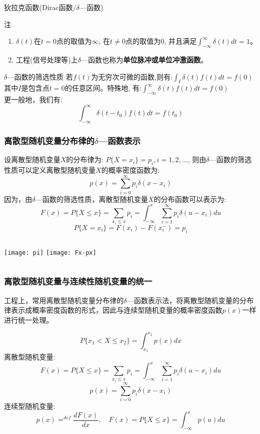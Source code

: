 \begin{frame}{狄拉克函数(Dirac函数/$\delta$---函数)}
\begin{block}{注}
\begin{enumerate}
	\item $\delta(t)$在$t=0$点的取值为$\infty$, 在$t\ne 0$点的取值为0, 并且满足$\int_{-\infty}^{\infty}\delta(t)dt=1$。
	\item 工程(信号处理等)上$\delta$---函数也称为\textbf{单位脉冲或单位冲激函数}。
\end{enumerate}
\end{block}
\begin{block}{$\delta$---函数的筛选性质}
若$f(t)$为无穷次可微的函数,则有:$\int_{I}\delta(t)f(t)dt=f(0) $\\
其中$I$是包含点$t=0$的任意区间。特殊地, 有:$\int_{-\infty}^{\infty}\delta(t)f(t)dt=f(0) $\\
更一般地，我们有:
$$\int_{-\infty}^{\infty}\delta(t-t_0)f(t)dt=f(t_0) $$
\end{block}
\end{frame}

\begin{frame}[shrink]
\frametitle{离散型随机变量分布律的$\delta$---函数表示}
设离散型随机变量$X$的分布律为: $P\{X=x_i\}=p_i,i=1,2,\dots$, 则由$\delta$---函数的筛选性质可以定义离散型随机变量$X$的概率密度函数为:
$$p(x)=\sum\limits_{i=0}^{\infty}p_i\delta(x-x_i)$$
因为，由$\delta$---函数的筛选性质，离散型随机变量$X$的分布函数可以表示为:
$$F(x)=P\{X\le x\}=\sum\limits_{x_i\le x}p_i=\int_{-\infty}^{x}\sum\limits_{i=1}^{\infty}p_i\delta(u-x_i)du$$
\[P\{X=x_i\}=F(x_i)-F(x_i^{-})=p_i\]
\begin{columns}
	\texttt{[image: pi]}
	\texttt{[image: Fx-px]}
\end{columns}
\end{frame}

\begin{frame}[shrink]
\frametitle{离散型随机变量与连续性随机变量的统一}
\begin{block}{}
	工程上，常用离散型随机变量分布律的$\delta$---函数表示法，将离散型随机变量的分布律表示成概率密度函数的形式，因此与连续型随机变量的概率密度函数$p(x)$一样进行统一处理。
\end{block}
$$P\{x_1< X\le x_2\}=\int_{x_1}^{x_2}p(x)dx$$
离散型随机变量:
	$$F(x)=P\{X\le x\}=\sum\limits_{x_i\le x}p_i=\int_{-\infty}^{x}\sum\limits_{i=1}^{\infty}p_i\delta(u-x_i)du$$
	$$p(x)=\sum\limits_{i=0}^{\infty}p_i\delta(x-x_i)$$
连续型随机变量:
	$$p(x)\mathop{=}^{def}\frac{dF(x)}{dx},\quad F(x)=P\{X\le x\}=\int_{-\infty}^{x}p(u)du$$

\end{frame}

